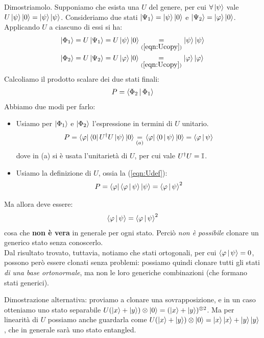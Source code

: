 \documentclass[../../InformazioneQuantistica.tex]{subfiles}
\begin{document}
Dimostriamolo. Supponiamo che esista una $U$ del genere, per cui $\forall \Ket{\psi}$ vale $U\Ket{\psi}\Ket{0} = \Ket{\psi}\Ket{\psi}$. Consideriamo due stati $\Ket{\Psi_1}=\Ket{\psi}\Ket{0}$ e $\Ket{\Psi_2}=\Ket{\varphi}\Ket{0}$. Applicando $U$ a ciascuno di essi si ha:
\begin{align}
\Ket{\Phi_1} &= U\Ket{\Psi_1}=
U\Ket{\psi}\Ket{0} \underset{(\ref{eqn:Ucopy})}{=} \Ket{\psi}\Ket{\psi} \nonumber\\
\Ket{\Phi_2} &= U\Ket{\Psi_2} =
U\Ket{\varphi}\Ket{0}  \underset{(\ref{eqn:Ucopy})}{=} \Ket{\varphi}\Ket{\varphi}
\label{eqn:Udef}
\end{align}
Calcoliamo il prodotto scalare dei due stati finali:
\begin{align*}
P = \Braket{\Phi_2|\Phi_1}
\end{align*}
Abbiamo due modi per farlo:
\begin{itemize}
\item Usiamo per $\Ket{\Phi_1}$ e $\Ket{\Phi_2}$ l'espressione in termini di $U$ unitario.
\begin{align*}
P = \Bra{\varphi}\Bra{0}U^\dag U \Ket{\psi}\Ket{0} \underset{(a)}{=} \Bra{\varphi}\Braket{0|\psi}\Ket{0} = \Braket{\varphi|\psi}
\end{align*}
dove in (a) si è usata l'unitarietà di $U$, per cui vale $U^\dag U = \mathbb{I}$.

\item Usiamo la definizione di $U$, ossia la (\ref{eqn:Udef}):
\begin{align*}
P = \Bra{\varphi}\Braket{\varphi|\psi}\Ket{\psi} = \Braket{\varphi|\psi}^2
\end{align*}
\end{itemize}
Ma allora deve essere:
\begin{align*}
\Braket{\varphi|\psi} = \Braket{\varphi|\psi}^2
\end{align*}
cosa che \textbf{non è vera} in generale per ogni stato. Perciò \textit{non è possibile} clonare un generico stato senza conoscerlo.\\
Dal risultato trovato, tuttavia, notiamo che stati ortogonali, per cui $\Braket{\varphi|\psi}=0$, possono però essere clonati senza problemi: possiamo quindi clonare tutti gli stati \textit{di una base ortonormale}, ma non le loro generiche combinazioni (che formano stati generici).

\begin{appr}
    Dimostrazione alternativa: proviamo a clonare una sovrapposizione, e in un caso otteniamo uno stato separabile \(U (\Ket{x} + \Ket{y}) \otimes \Ket{0} = (\Ket{x} + \Ket{y}) ^{\otimes 2} \). Ma per linearità di $U$ possiamo anche guardarla come \(U (\Ket{x} + \Ket{y}) \otimes \Ket{0} = \Ket{x} \Ket{x} + \Ket{y} \Ket{y} \), che in generale sarà uno stato entangled.
\end{appr}
\end{document}
